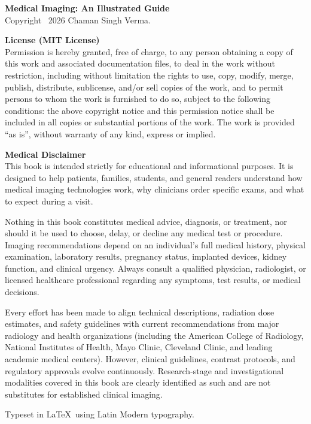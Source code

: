\thispagestyle{empty}
\vspace*{\fill}

\noindent\textbf{Medical Imaging: An Illustrated Guide}\\
Copyright \textcopyright\ 2026 Chaman Singh Verma.

\vspace{0.8em}
\noindent\textbf{License (MIT License)}\\
Permission is hereby granted, free of charge, to any person obtaining a copy of this work and associated documentation files, to deal in the work without restriction, including without limitation the rights to use, copy, modify, merge, publish, distribute, sublicense, and/or sell copies of the work, and to permit persons to whom the work is furnished to do so, subject to the following conditions: the above copyright notice and this permission notice shall be included in all copies or substantial portions of the work. The work is provided ``as is'', without warranty of any kind, express or implied.

\vspace{1.2em}
\noindent\textbf{Medical Disclaimer}\\
This book is intended strictly for educational and informational purposes. It is designed to help patients, families, students, and general readers understand how medical imaging technologies work, why clinicians order specific exams, and what to expect during a visit.

Nothing in this book constitutes medical advice, diagnosis, or treatment, nor should it be used to choose, delay, or decline any medical test or procedure. Imaging recommendations depend on an individual's full medical history, physical examination, laboratory results, pregnancy status, implanted devices, kidney function, and clinical urgency. Always consult a qualified physician, radiologist, or licensed healthcare professional regarding any symptoms, test results, or medical decisions.

Every effort has been made to align technical descriptions, radiation dose estimates, and safety guidelines with current recommendations from major radiology and health organizations (including the American College of Radiology, National Institutes of Health, Mayo Clinic, Cleveland Clinic, and leading academic medical centers). However, clinical guidelines, contrast protocols, and regulatory approvals evolve continuously. Research-stage and investigational modalities covered in this book are clearly identified as such and are not substitutes for established clinical imaging.

\vspace{1.2em}
\noindent Typeset in \LaTeX\ using Latin Modern typography.
\clearpage
